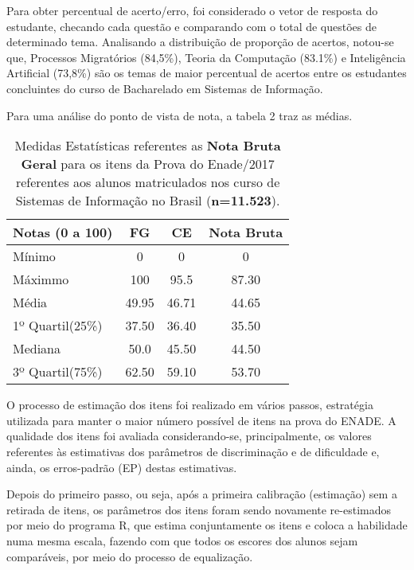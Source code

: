 \documentclass[12pt]{article}
\begin{document}
Para obter percentual de acerto/erro, foi considerado o vetor de resposta do estudante, checando cada questão e comparando com o total de questões de determinado tema. Analisando a distribuição de proporção de acertos, notou-se que, Processos Migratórios (84,5\%), Teoria da Computação (83.1\%) e Inteligência Artificial (73,8\%) são os temas de maior percentual de acertos entre os estudantes concluintes do curso de Bacharelado em Sistemas de Informação.


Para uma análise do ponto de vista de nota, a tabela 2 traz as médias.


\begin{table}[htb]
	\centering
	\caption{Medidas Estatísticas referentes as \textbf{Nota Bruta Geral} para os itens da Prova do Enade/2017 referentes aos alunos matriculados nos curso de Sistemas de Informação no Brasil (\textbf{n=11.523}).}
\begin{tabular}{l|c|c|c}
\hline\hline 
    Notas (0 a 100)           &    FG    &   CE  &  Nota Bruta  \\
\hline\hline
 Mínimo            &  0      &  0                   &  0           \\
 Máximmo           &  100    &  95.5                &  87.30       \\
 Média             & 49.95   &  46.71               &  44.65       \\
 1º Quartil(25\%)  &  37.50  &  36.40               &  35.50       \\
 Mediana           &  50.0   & 45.50                &  44.50       \\
 3º Quartil(75\%)  &  62.50  &  59.10               &  53.70       \\
\hline\hline
\end{tabular}
\end{table}
\vskip0.3cm



\newpage
O processo de estimação dos itens foi realizado em vários passos, estratégia utilizada para manter o maior número possível de itens na prova do ENADE. A qualidade dos itens foi avaliada considerando-se, principalmente, os valores referentes às estimativas dos parâmetros de discriminação e de dificuldade e, ainda, os erros-padrão (EP) destas estimativas.

Depois do primeiro passo, ou seja, após a primeira calibração (estimação) sem a retirada de itens, os parâmetros dos itens foram sendo novamente re-estimados por meio do programa R, que estima conjuntamente os itens e coloca a habilidade numa mesma escala, fazendo com que todos os escores dos alunos sejam comparáveis, por meio do processo de equalização.
\end{document}
